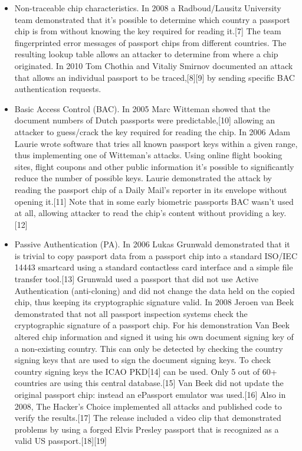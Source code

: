 \begin{itemize}
	\item Non-traceable chip characteristics. In 2008 a Radboud/Lausitz University team demonstrated that it's possible to determine which country a passport chip is from without knowing the key required for reading it.[7] The team fingerprinted error messages of passport chips from different countries. The resulting lookup table allows an attacker to determine from where a chip originated. In 2010 Tom Chothia and Vitaliy Smirnov documented an attack that allows an individual passport to be traced,[8][9] by sending specific BAC authentication requests.
  \item Basic Access Control (BAC). In 2005 Marc Witteman showed that the document numbers of Dutch passports were predictable,[10] allowing an attacker to guess/crack the key required for reading the chip. In 2006 Adam Laurie wrote software that tries all known passport keys within a given range, thus implementing one of Witteman's attacks. Using online flight booking sites, flight coupons and other public information it's possible to significantly reduce the number of possible keys. Laurie demonstrated the attack by reading the passport chip of a Daily Mail's reporter in its envelope without opening it.[11] Note that in some early biometric passports BAC wasn't used at all, allowing attacker to read the chip's content without providing a key.[12]
  \item Passive Authentication (PA). In 2006 Lukas Grunwald demonstrated that it is trivial to copy passport data from a passport chip into a standard ISO/IEC 14443 smartcard using a standard contactless card interface and a simple file transfer tool.[13] Grunwald used a passport that did not use Active Authentication (anti-cloning) and did not change the data held on the copied chip, thus keeping its cryptographic signature valid. In 2008 Jeroen van Beek demonstrated that not all passport inspection systems check the cryptographic signature of a passport chip. For his demonstration Van Beek altered chip information and signed it using his own document signing key of a non-existing country. This can only be detected by checking the country signing keys that are used to sign the document signing keys. To check country signing keys the ICAO PKD[14] can be used. Only 5 out of 60+ countries are using this central database.[15] Van Beek did not update the original passport chip: instead an ePassport emulator was used.[16] Also in 2008, The Hacker's Choice implemented all attacks and published code to verify the results.[17] The release included a video clip that demonstrated problems by using a forged Elvis Presley passport that is recognized as a valid US passport.[18][19]

\end{itemize}
